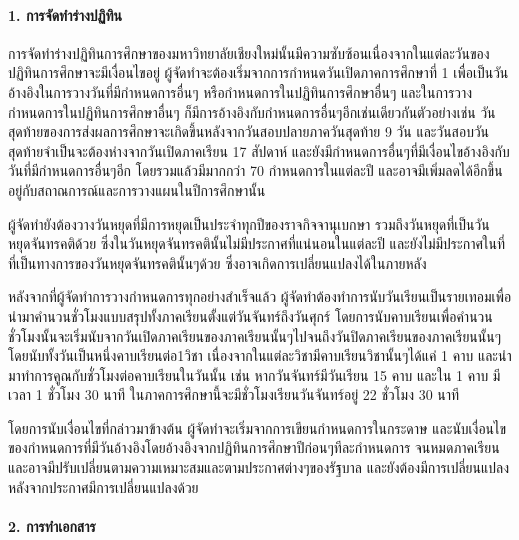 \paragraph{1. การจัดทำร่างปฏิทิน}

\par การจัดทำร่างปฏิทินการศึกษาของมหาวิทยาลัยเชียงใหม่นั้นมีความซับซ้อนเนื่องจากในแต่ละวันของปฏิทินการศึกษาจะมีเงื่อนไขอยู่ ผู้จัดทำจะต้องเริ่มจากการกำหนดวันเปิดภาคการศึกษาที่ 1 เพื่อเป็นวันอ้างอิงในการวางวันที่มีกำหนดการอื่นๆ หรือกำหนดการในปฏิทินการศึกษาอื่นๆ และในการวางกำหนดการในปฏิทินการศึกษาอื่นๆ ก็มีการอ้างอิงกับกำหนดการอื่นๆอีกเช่นเดียวกันตัวอย่างเช่น วันสุดท้ายของการส่งผลการศึกษาจะเกิดขึ้นหลังจากวันสอบปลายภาควันสุดท้าย 9 วัน และวันสอบวันสุดท้ายจำเป็นจะต้องห่างจากวันเปิดภาคเรียน 17 สัปดาห์ และยังมีกำหนดการอื่นๆที่มีเงื่อนไขอ้างอิงกับวันที่มีกำหนดการอื่นๆอีก โดยรวมแล้วมีมากกว่า 70 กำหนดการในแต่ละปี และอาจมีเพิ่มลดได้อีกขึ้นอยู่กับสถาณการณ์และการวางแผนในปีการศึกษานั้น


\par ผู้จัดทำยังต้องวางวันหยุดที่มีการหยุดเป็นประจำทุกปีของราจกิจจานุเบกษา รวมถึงวันหยุดที่เป็นวันหยุดจันทรคติด้วย ซึ่งในวันหยุดจันทรคตินั้นไม่มีประกาศที่แน่นอนในแต่ละปี และยังไม่มีประกาศในที่ที่เป็นทางการของวันหยุดจันทรคตินั้นๆด้วย ซึ่งอาจเกิดการเปลี่ยนแปลงได้ในภายหลัง


\par หลังจากที่ผู้จัดทำการวางกำหนดการทุกอย่างสำเร็จแล้ว ผู้จัดทำต้องทำการนับวันเรียนเป็นรายเทอมเพื่อนำมาคำนวนชั่วโมงแบบสรุปทั้งภาคเรียนตั้งแต่วันจันทร์ถึงวันศุกร์ โดยการนับคาบเรียนเพื่อคำนวนชั่วโมงนั้นจะเริ่มนับจากวันเปิดภาคเรียนของภาคเรียนนั้นๆไปจนถึงวันปิดภาคเรียนของภาคเรียนนั้นๆ โดยนับทั้งวันเป็นหนึ่งคาบเรียนต่อ1วิชา เนื่องจากในแต่ละวิชามีคาบเรียนวิชานั้นๆได้แค่ 1 คาบ และนำมาทำการคูณกับชั่วโมงต่อคาบเรียนในวันนั้น เช่น หากวันจันทร์มีวันเรียน 15 คาบ และใน 1 คาบ มีเวลา 1 ชั่วโมง 30 นาที ในภาคการศึกษานี้จะมีชั่วโมงเรียนวันจันทร์อยู่ 22 ชั่วโมง 30 นาที


\par โดยการนับเงื่อนไขที่กล่าวมาข้างต้น ผู้จัดทำจะเริ่มจากการเขียนกำหนดการในกระดาษ และนับเงื่อนไขของกำหนดการที่มีวันอ้างอิงโดยอ้างอิงจากปฏิทินการศึกษาปีก่อนๆทีละกำหนดการ จนหมดภาคเรียน และอาจมีปรับเปลี่ยนตามความเหมาะสมและตามประกาศต่างๆของรัฐบาล และยังต้องมีการเปลี่ยนแปลงหลังจากประกาศมีการเปลี่ยนแปลงด้วย

\paragraph{2. การทำเอกสาร}\enskip


